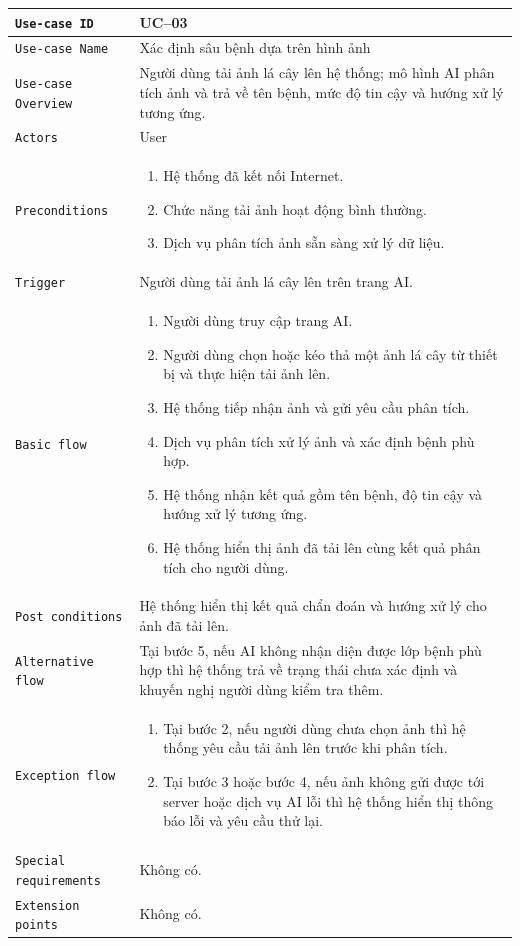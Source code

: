 \begin{longtable}{|P{4.8cm}|m{10cm}|}\hline
	\texttt{Use-case ID} & UC--03\\
	\hline
	\texttt{Use-case Name} & Xác định sâu bệnh dựa trên hình ảnh\\
	\hline
	\texttt{Use-case Overview} & Người dùng tải ảnh lá cây lên hệ thống; mô hình AI phân tích ảnh và trả về tên bệnh, mức độ tin cậy và hướng xử lý tương ứng.
	\\
	\hline
	\texttt{Actors} & User
	\\
	\hline
	\texttt{Preconditions} &
	\begin{enumerate}[label = \arabic*.]
		\item Hệ thống đã kết nối Internet.
		\item Chức năng tải ảnh hoạt động bình thường.
		\item Dịch vụ phân tích ảnh sẵn sàng xử lý dữ liệu.
	\end{enumerate}
	\\
	\hline
	\texttt{Trigger} & Người dùng tải ảnh lá cây lên trên trang AI.\\
	\hline
	\texttt{Basic flow} &
	\begin{enumerate}
		\item Người dùng truy cập trang AI.
		\item Người dùng chọn hoặc kéo thả một ảnh lá cây từ thiết bị và thực hiện tải ảnh lên.
		\item Hệ thống tiếp nhận ảnh và gửi yêu cầu phân tích.
		\item Dịch vụ phân tích xử lý ảnh và xác định bệnh phù hợp.
		\item Hệ thống nhận kết quả gồm tên bệnh, độ tin cậy và hướng xử lý tương ứng.
		\item Hệ thống hiển thị ảnh đã tải lên cùng kết quả phân tích cho người dùng.
	\end{enumerate}
	\\
	\hline
	\texttt{Post conditions} &
	Hệ thống hiển thị kết quả chẩn đoán và hướng xử lý cho ảnh đã tải lên.
	\\
	\hline
	\texttt{Alternative flow} & Tại bước 5, nếu AI không nhận diện được lớp bệnh phù hợp thì hệ thống trả về trạng thái chưa xác định và khuyến nghị người dùng kiểm tra thêm.\\
	\hline
	\texttt{Exception flow} &
	\begin{enumerate}[label = E\arabic*:]
		\item Tại bước 2, nếu người dùng chưa chọn ảnh thì hệ thống yêu cầu tải ảnh lên trước khi phân tích.
		\item Tại bước 3 hoặc bước 4, nếu ảnh không gửi được tới server hoặc dịch vụ AI lỗi thì hệ thống hiển thị thông báo lỗi và yêu cầu thử lại.
	\end{enumerate}
	\\
	\hline
	\texttt{Special requirements} & Không có.\\
	\hline
	\texttt{Extension points} & Không có.\\
	\hline


\end{longtable}
